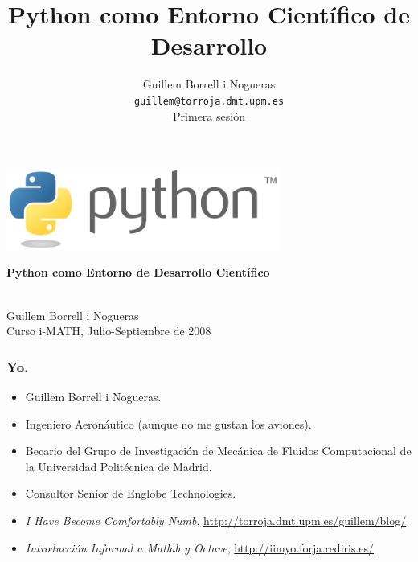 \documentclass{beamer}
\title{Python como Entorno Científico de Desarrollo}
\author{
Guillem Borrell i Nogueras\\
\texttt{guillem@torroja.dmt.upm.es}\\
Primera sesión
}
\begin{document}

\begin{frame}
\begin{center}
 \includegraphics[width=9cm]{files/python-logo-generic.pdf}\\
\begin{large}
\textbf{Python como Entorno de Desarrollo Científico}
\end{large}\\

Guillem Borrell i Nogueras\\

Curso i-MATH, Julio-Septiembre de 2008
\end{center}

\end{frame}


\begin{frame}
  \frametitle{Yo.}
  \begin{itemize}
  \item Guillem Borrell i Nogueras.
  \item Ingeniero Aeronáutico (aunque no me gustan los aviones).
  \item Becario del Grupo de Investigación de Mecánica de Fluidos
    Computacional de la Universidad Politécnica de Madrid.
  \item Consultor Senior de Englobe Technologies.
  \item \textit{I Have Become Comfortably Numb},
    \url{http://torroja.dmt.upm.es/guillem/blog/}
  \item \textit{Introducción Informal a Matlab y Octave},
    \url{http://iimyo.forja.rediris.es/}
  \end{itemize}
\end{frame}
\end{document}
